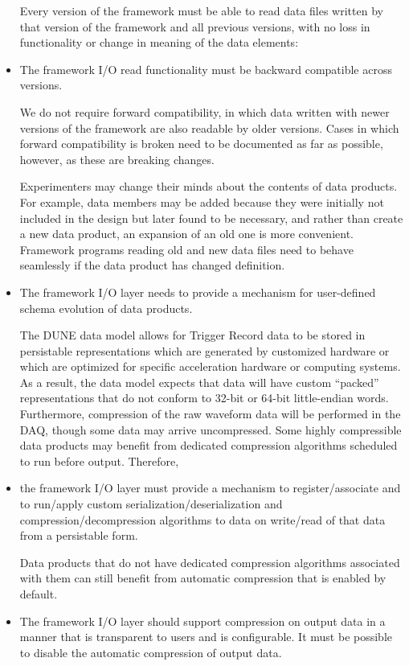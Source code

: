 \documentclass[../main-v1.tex]{subfiles}
\begin{document}
\begin{itemize}
Every version of the framework must be able to read data files written by that version of the framework and all previous versions, with no loss in functionality or change in meaning of the data elements:

\item The framework I/O read functionality must be backward compatible across versions.

We do not require forward compatibility, in which data written with newer versions of the framework are also readable by older versions.  Cases in which forward compatibility is broken need to be documented as far as possible, however, as these are breaking changes.  

Experimenters may change their minds about the contents of data products.  For example, data members may be added because they were initially not included in the design but later found to be necessary, and rather than create a new data product, an expansion of an old one is more convenient.  Framework programs reading old and new data files need to behave seamlessly if the data product has changed definition.

\item The framework I/O layer needs to provide a mechanism for user-defined schema evolution of data products.

The DUNE data model allows for Trigger Record data to be stored in persistable representations which are generated by customized hardware or which are optimized for specific acceleration hardware or computing systems.  As a result, the data model expects that data will have custom “packed” representations that do not conform to 32-bit or 64-bit little-endian words. Furthermore, compression of the raw waveform data will be performed in the DAQ, though some data may arrive uncompressed.  Some highly compressible data products may benefit from dedicated compression algorithms scheduled to run before output. Therefore, 

\item the framework I/O layer must provide a mechanism to register/associate and to run/apply custom serialization/deserialization and compression/decompression algorithms to data on write/read of that data from a persistable form.  

Data products that do not have dedicated compression algorithms associated with them can still benefit from automatic compression that is enabled by default.

\item The framework I/O layer should support compression on output data in a manner that is transparent to users and is configurable.  It must be possible to disable the automatic compression of output data.


\end{itemize}
\end{document}
